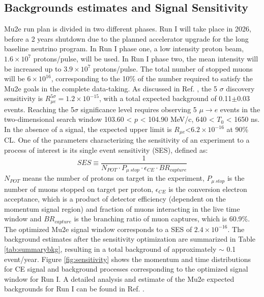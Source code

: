 \subsection{Backgrounds estimates and Signal Sensitivity}
Mu2e run plan is divided in two different phases. Run I will take place in 2026, before a 2 years shutdown due to the 
planned accelerator upgrade for the long baseline neutrino program. In Run I phase one, a low intensity proton beam, 
$1.6 \times 10^7$ protons/pulse, will be used. In Run I phase two, the mean intensity will be increased up to $3.9 \times 10^7$ 
protons/pulse. The total number of stopped muons will be $6 \times 10^{16}$, corresponding to the 10\% of the number required to 
satisfy the Mu2e goals in the complete data-taking. As discussed in Ref. \cite{universe9010054}, the 5 $\sigma$ discovery sensitivity is 
$R_{\mu e}^{5 \sigma} = 1.2 \times 10^{-15} $, with a total expected background of 0.11$\pm$0.03 events. 
Reaching the 5$\sigma$ significance level requires observing 5 $\mu\rightarrow e$ events in the two-dimensional search window 
103.60 < $p$ < 104.90 MeV/c, 640 < $T_0$ < 1650 ns. In the absence of a signal, the expected upper limit is $R_{\mu e}$<$6.2 \times 10^{-16}$
at 90\% CL. 
One of the parameters characterizing the sensitivity of an experiment to a process of interest is its
single event sensitivity (SES), defined as:
\begin{equation}
    SES \equiv \frac{1}{N_{POT} \cdot P_{\mu \ stop} \cdot \epsilon_{CE} \cdot BR_{capture}}
\end{equation} 
$N_{POT}$ means the number of protons on target in the experiment, $P_{\mu \ stop}$ is the number of muons stopped on target per proton, $\epsilon_{CE}$ is the conversion electron acceptance, which is a product of detector efficiency (dependent on the momentum signal region) and fraction of muons interacting in the live time window and $BR_{capture}$ is the branching ratio of muon captures, which is 60.9\%. The optimized Mu2e signal window corresponds to a SES of $2.4 \times 10^{-16}$. The background estimates after the sensitivity optimization are summarized in Table \ref{tab:summarybkg}, resulting in a total background of approximately $\sim$ 0.1 event/year. Figure \ref{fig:sensitivity} shows the momentum and time distributions for CE signal and background processes corresponding to the optimized signal window for Run I. A detailed analysis and estimate of the Mu2e expected backgrounds for Run I can be found in Ref. \cite{universe9010054}.
